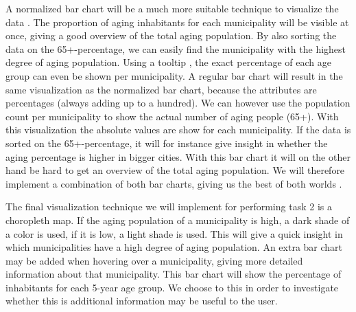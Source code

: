 A normalized bar chart will be a much more suitable technique to visualize the data \cite{D3sbc}. The proportion of aging inhabitants for each municipality will be visible at once, giving a good overview of the total aging population. By also sorting the data on the 65+-percentage, we can easily find the municipality with the highest degree of aging population. Using a tooltip \cite{D3sbctooltip}, the exact percentage of each age group can even be shown per municipality. A regular bar chart will result in the same visualization as the normalized bar chart, because the attributes are percentages (always adding up to a hundred). We can however use the population count per municipality to show the actual number of aging people (65+). With this visualization the absolute values are show for each municipality. If the data is sorted on the 65+-percentage, it will for instance give insight in whether the aging percentage is higher in bigger cities. With this bar chart it will on the other hand be hard to get an overview of the total aging population. We will therefore implement a combination of both bar charts, giving us the best of both worlds \cite{D3sbctrans}.

The final visualization technique we will implement for performing task 2 is a choropleth map. If the aging population of a municipality is high, a dark shade of a color is used, if it is low, a light shade is used. This will give a quick insight in which municipalities have a high degree of aging population. An extra bar chart \cite{D3bc} may be added when hovering over a municipality, giving more detailed information about that municipality. This bar chart will show the percentage of inhabitants for each 5-year age group. We choose to this in order to investigate whether this is additional information may be useful to the user.
